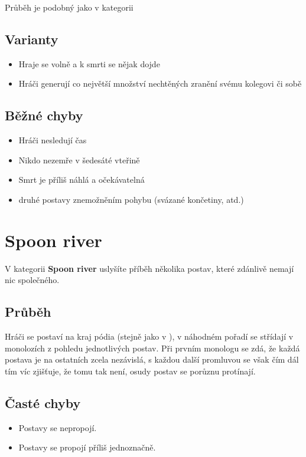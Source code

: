 Průběh je podobný jako v kategorii  
 
\subsection{ Varianty } \begin{itemize}
\item Hraje se volně a k smrti se nějak dojde
\item Hráči generují co největší množství nechtěných zranění svému kolegovi či sobě
\end{itemize}
 
\subsection{ Běžné chyby } \begin{itemize}
\item Hráči nesledují čas
\item Nikdo nezemře v šedesáté vteřině
\item Smrt je příliš náhlá a očekávatelná
\item {} druhé postavy znemožněním pohybu (svázané končetiny, atd.)
\end{itemize}
 
 
 
 
\needspace{5cm} \section{Spoon river} \label{spoon river}  
V kategorii \textbf{Spoon river}{} uslyšíte příběh několika postav, které zdánlivě nemají nic společného. 
 
\subsection{Průběh} Hráči se postaví na kraj pódia (stejně jako v ), v náhodném pořadí se střídají v monolozích z pohledu jednotlivých postav. 
Při prvním monologu se zdá, že každá postava je na ostatních zcela nezávislá, s každou další promluvou se však čím dál tím víc zjišťuje, že tomu tak není, osudy postav se porůznu protínají. 
 
\subsection{Časté chyby} \begin{itemize}
\item Postavy se nepropojí.
\item Postavy se propojí příliš jednoznačně.
\end{itemize}
 
